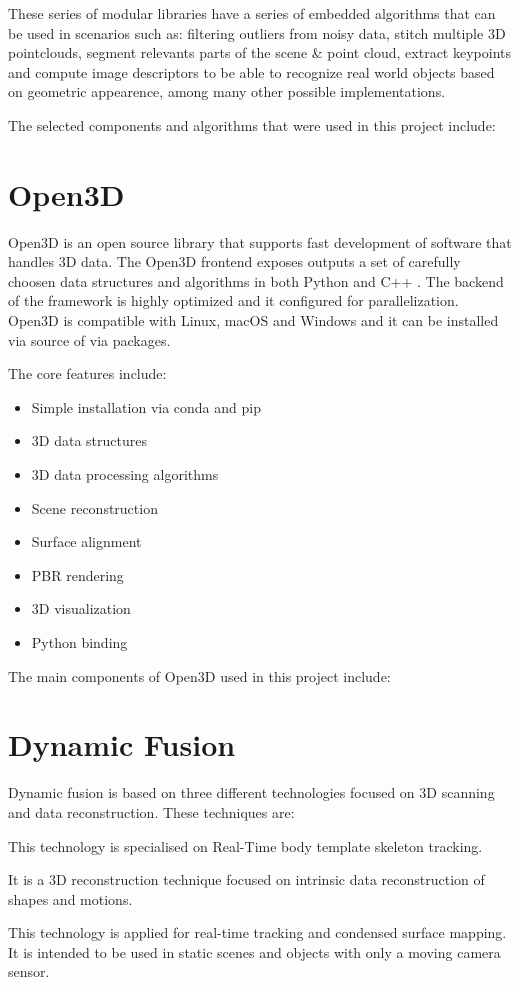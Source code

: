 \documentclass[12pt]{report}
\begin{document}
These series of modular libraries  have a series of embedded algorithms  that can be used in scenarios such as: filtering outliers from noisy data, stitch multiple 3D pointclouds,
segment relevants parts of the scene \& point cloud, extract keypoints and compute image descriptors to be able to recognize real world objects based on geometric appearence, among many other possible implementations.

The selected components and algorithms that were used in this project include: 



\section{Open3D}
Open3D is an open source library that supports fast development of software that handles 3D data.
The Open3D frontend exposes outputs a set of carefully choosen data structures and algorithms in both Python and C++ . 
The backend of the framework is highly optimized and it configured for parallelization.
Open3D is compatible with Linux, macOS and Windows and it can be installed via source of via packages. 

The core features include: 
\begin{multicols}{2}
  \begin{itemize}
    \item Simple installation via conda and pip
    \item 3D data structures
    \item 3D data processing algorithms
    \item Scene reconstruction
    \item Surface alignment
    \item PBR rendering
    \item 3D visualization
    \item Python binding
  \end{itemize}
  \end{multicols}

The main components of Open3D used in this project include:


\section{Dynamic Fusion}
Dynamic fusion is based on three different technologies focused on 3D scanning and data reconstruction. These techniques are: 

\begin{description}[style=nextline]
  \item[DART (Dense Articulated Real-Time Tracking)] This technology is specialised on Real-Time body template skeleton tracking.
  \item[Animation Cartography] It is a 3D reconstruction technique focused on intrinsic data reconstruction of shapes and motions. 
  \item[Kinect Fusion] This technology is applied for real-time tracking and condensed surface mapping. It is intended to be used in static scenes and objects with only a moving camera sensor. 
\end{description} 
\end{document}
